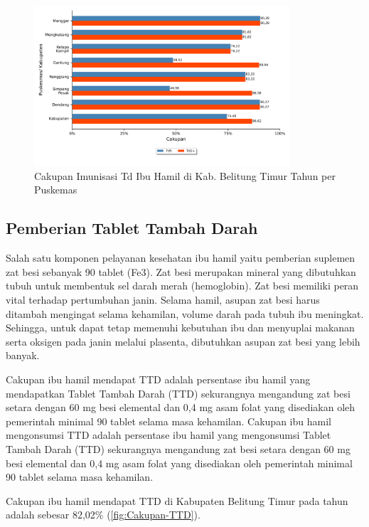 \begin{figure}[H]
    \centering{}
    \includegraphics[width=0.85\textwidth]{bab_05/bab_05_04_Td}
    \caption{Cakupan Imunisasi Td Ibu Hamil di Kab. Belitung Timur Tahun \tP per Puskemas}
    \label{fig:Cakupan-Td}
\end{figure}

\subsection{Pemberian Tablet Tambah Darah}
Salah satu komponen pelayanan kesehatan ibu hamil yaitu pemberian suplemen zat besi sebanyak 90 tablet (Fe3).
Zat besi merupakan mineral yang dibutuhkan tubuh untuk membentuk sel darah merah (hemoglobin).
Zat besi memiliki peran vital terhadap pertumbuhan janin.
Selama hamil, asupan zat besi harus ditambah mengingat selama kehamilan, volume darah pada tubuh ibu meningkat.
Sehingga, untuk dapat tetap memenuhi kebutuhan ibu dan menyuplai makanan serta oksigen pada janin melalui plasenta, dibutuhkan asupan zat besi yang lebih banyak.

Cakupan ibu hamil mendapat TTD adalah persentase ibu hamil yang mendapatkan Tablet Tambah Darah (TTD) sekurangnya mengandung zat besi setara dengan 60 mg besi elemental dan 0,4 mg asam folat yang disediakan oleh pemerintah minimal 90 tablet selama masa kehamilan. Cakupan ibu hamil mengonsumsi TTD adalah persentase ibu hamil yang mengonsumsi Tablet Tambah Darah (TTD) sekurangnya mengandung zat besi setara dengan 60 mg besi elemental dan 0,4 mg asam folat yang disediakan oleh pemerintah minimal 90 tablet selama masa kehamilan.

Cakupan ibu hamil mendapat TTD di Kabupaten Belitung Timur pada tahun \tP adalah sebesar 82,02\% (\autoref{fig:Cakupan-TTD}).

